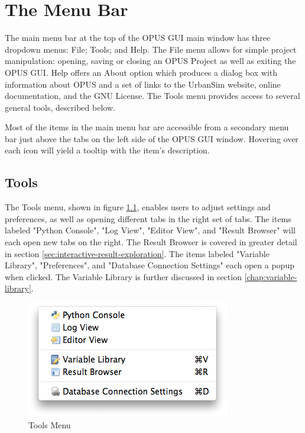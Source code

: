 \chapter{The Menu Bar}

The main menu bar at the top of the OPUS GUI main window has three dropdown menus: File; Tools; and Help.  The File menu allows for simple project manipulation: opening, saving or closing an OPUS Project as well as exiting the OPUS GUI.  Help offers an About option which produces a dialog box with information about OPUS and a set of links to the UrbanSim website, online documentation, and the GNU License.  The Tools menu provides access to several general tools, described below.

Most of the items in the main menu bar are accessible from a secondary menu bar just above the tabs on the left side of the OPUS GUI window.  Hovering over each icon will yield a tooltip with the item's description.

\section{Tools}

The Tools menu, shown in figure \ref{fig:menu-bar-tools}, enables users to adjust settings and preferences, as well as opening different tabs in the right set of tabs.  The items labeled "Python Console", "Log View", "Editor View", and "Result Browser" will each open new tabs on the right.  The Result Browser is covered in greater detail in section \ref{sec:interactive-result-exploration}.  The items labeled "Variable Library", "Preferences", and "Database Connection Settings" each open a popup when clicked.  The Variable Library is further discussed in section \ref{chap:variable-library}.

\begin{figure}[htp]
\begin{center}
\includegraphics[scale=0.4]{part-gui/images/menu-bar-tools.png}
\end{center}
\caption{Tools Menu}
\label{fig:menu-bar-tools}
\end{figure}


